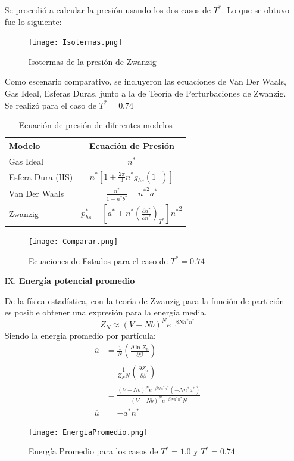 \documentclass[12pt,letterpaper]{article}
\newcommand{\pd}[3] {\left(\frac{\partial #1}{\partial #2}\right)_{#3}}
\begin{document}
\begin{enumerate}
Se procedió a calcular la presión usando los dos casos de $T^*$. Lo que se obtuvo fue lo siguiente:
\begin{figure}[H]
	\centering
	\texttt{[image: Isotermas.png]}
	\caption{Isotermas de la presión de Zwanzig}
\end{figure}
Como escenario comparativo, se incluyeron las ecuaciones de Van Der Waals, Gas Ideal, Esferas Duras, junto a la de Teoría de Perturbaciones de Zwanzig. Se realizó para el caso de $T^*=0.74$
\begin{table}[H]
\centering
\begin{tabular}{|l|c|}
\hline 
Modelo & Ecuación de Presión \\ \hline 
Gas Ideal & $n^*$ \\ \hline 
Esfera Dura (HS) & $n^* \left[  1+\frac{2\pi}{3} n^* g_{hs}(1^+) \right] $\\ \hline 
Van Der Waals &  $\frac{n^*}{1-n^*b^*} - {n^*}^2a^*$ \\ \hline 
Zwanzig & $ p^*_{hs} - \left[ a^* + n^* \left(\frac{\partial a^*}{\partial n^*}\right)_{T^*} \right] {n^*}^2 $ \\ \hline 
\end{tabular} 
\caption{Ecuación de presión de diferentes modelos}
\end{table}
\begin{figure}[H]
	\centering 
	\texttt{[image: Comparar.png]}
	\caption{Ecuaciones de Estados para el caso de $T^*=0.74$}
	\label{Fig:EcEst_Compara}
\end{figure}

\item[IX.]\textbf{Energía potencial promedio}

De la física estadística, con la teoría de Zwanzig para la función de partición es posible obtener una expresión para la energía media.
\begin{equation}
	Z_N \approx \left( V-Nb\right)^N e^{-\beta N a^*n^*}
\end{equation}
Siendo la energía promedio por partícula:
\begin{align}
	\overline{u} &= \frac{1}{N} \pd{\ln Z_n}{\beta}{} \nonumber\\
	&= \frac{1}{Z_N N} \pd{Z_n}{\beta}{} \nonumber \\
	&= \frac{ \left( V-Nb\right)^N e^{-\beta N a^*n^*} \left(-Nn^*a^*\right)  }{\left( V-Nb\right)^N e^{-\beta N a^*n^*} N}  \nonumber \\
	\overline{u} &= -a^*n^* \label{EnergiaPromedio}
\end{align}

\begin{figure}[H]
	\centering 
	\texttt{[image: EnergiaPromedio.png]}
	\caption{Energía Promedio para los casos de $T^*=1.0$ y $T^*=0.74$}
	\label{Fig:EnergiaPromedio}
\end{figure}






\end{enumerate}

\pagebreak






\end{document}
